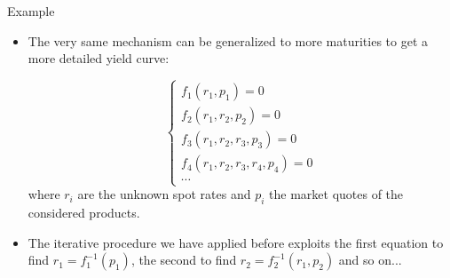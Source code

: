 \documentclass{beamer}
\begin{document}
\begin{frame}[fragile]{Example}
\begin{itemize}
\item The very same mechanism can be generalized to more maturities to get a more detailed yield curve: 
 
\begin{equation*}
 \begin{cases}
 f_1(r_1, p_1) = 0 \\
 f_2(r_1, r_2, p_2) = 0 \\
 f_3(r_1, r_2, r_3, p_3) = 0 \\
 f_4(r_1, r_2, r_3, r_4, p_4) = 0 \\
 \cdots
 \end{cases}
 \end{equation*}
where $r_i$ are the unknown spot rates and $p_i$ the market quotes of the considered products. 
 
 \item The iterative procedure we have applied before exploits the first equation to find $r_1 = f_1^{-1}(p_1)$, the second to find $r_2 = f_2^{-1}(r_1, p_2)$ and so on...
\end{itemize}
\end{frame} 
 
\end{document}
